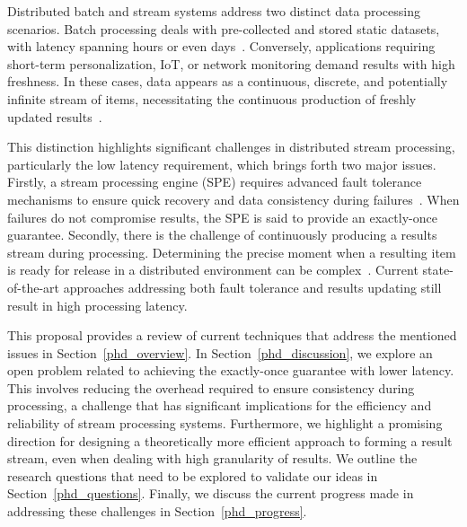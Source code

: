 Distributed batch and stream systems address two distinct data processing scenarios. Batch processing deals with pre-collected and stored static datasets, with latency spanning hours or even days~\cite{carbone2015apache, chang2014hawq, sun2023survey}. Conversely, applications requiring short-term personalization, IoT, or network monitoring demand results with high freshness. In these cases, data appears as a continuous, discrete, and potentially infinite stream of items, necessitating the continuous production of freshly updated results~\cite{fragkoulis2024survey, diro2024anomaly}.

This distinction highlights significant challenges in distributed stream processing, particularly the low latency requirement, which brings forth two major issues. Firstly, a stream processing engine (SPE) requires advanced fault tolerance mechanisms to ensure quick recovery and data consistency during failures~\cite{Wang:2019:LSF:3341301.3359653, akidau2015streaming}. When failures do not compromise results, the SPE is said to provide an exactly-once guarantee. Secondly, there is the challenge of continuously producing a results stream during processing. Determining the precise moment when a resulting item is ready for release in a distributed environment can be complex~\cite{Tucker:2003:EPS:776752.776780, DBLP:journals/pvldb/BegoliACHKKMS21}. Current state-of-the-art approaches addressing both fault tolerance and results updating still result in high processing latency.

This proposal provides a review of current techniques that address the mentioned issues in Section~\ref{phd_overview}. In Section~\ref{phd_discussion}, we explore an open problem related to achieving the exactly-once guarantee with lower latency. This involves reducing the overhead required to ensure consistency during processing, a challenge that has significant implications for the efficiency and reliability of stream processing systems. Furthermore, we highlight a promising direction for designing a theoretically more efficient approach to forming a result stream, even when dealing with high granularity of results. We outline the research questions that need to be explored to validate our ideas in Section~\ref{phd_questions}. Finally, we discuss the current progress made in addressing these challenges in Section~\ref{phd_progress}.